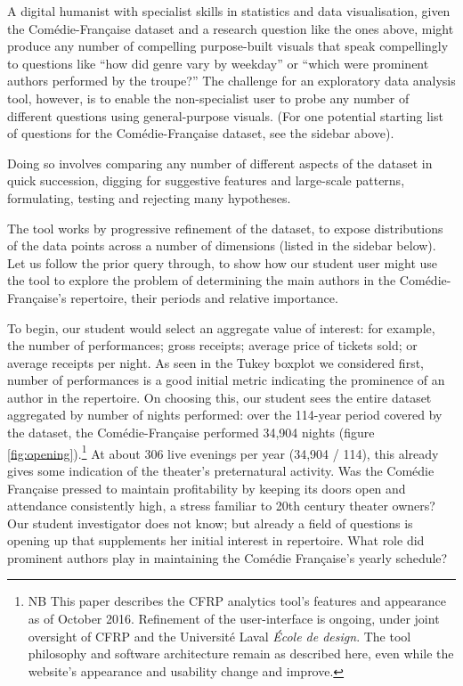 \documentclass[	DIV=calc,%
							paper=a4,%
							fontsize=11pt,%
							twocolumn]{scrartcl}	 					%
\begin{document}
A digital humanist with specialist skills in statistics and data visualisation, given the Comédie-Française dataset and a research question like the ones above, might produce any number of compelling purpose-built visuals that speak compellingly to questions like ``how did genre vary by weekday'' or ``which were prominent authors performed by the troupe?''  The challenge for an exploratory data analysis tool, however, is to enable the non-specialist user to probe any number of different questions using general-purpose visuals.  (For one potential starting list of questions for the Comédie-Française dataset, see the sidebar above).

Doing so involves comparing any number of different aspects of the dataset in quick succession, digging for suggestive features and large-scale patterns, formulating, testing and rejecting many hypotheses.

The tool works by progressive refinement of the dataset, to expose distributions of the data points across a number of dimensions (listed in the sidebar below).  Let us follow the prior query through, to show how our student user might use the tool to explore the problem of determining the main authors in the Comédie-Française’s repertoire, their periods and relative importance.

To begin, our student would select an aggregate value of interest: for example, the number of performances; gross receipts; average price of tickets sold; or average receipts per night.  As seen in the Tukey boxplot we considered first, number of performances is a good initial metric indicating the prominence of an author in the repertoire.  On choosing this, our student sees the entire dataset aggregated by number of nights performed: over the 114-year period covered by the dataset, the Comédie-Française performed 34,904 nights (figure \ref{fig:opening}).\footnote{NB This paper describes the CFRP analytics tool's features and appearance as of October 2016.  Refinement of the user-interface is ongoing, under joint oversight of CFRP and the Université Laval \textit{École de design}.  The tool philosophy and software architecture remain as described here, even while the website's appearance and usability change and improve.}  At about 306 live evenings per year (34,904 / 114), this already gives some indication of the theater’s preternatural activity.  Was the Comédie Française pressed to maintain profitability by keeping its doors open and attendance consistently high, a stress familiar to 20th century theater owners?  Our student investigator does not know; but already a field of questions is opening up that supplements her initial interest in repertoire.  What role did prominent authors play in maintaining the Comédie Française’s yearly schedule?
\end{document}
